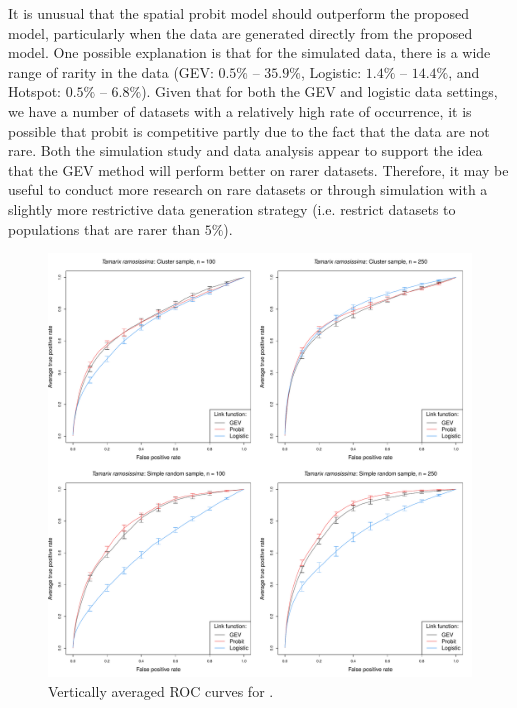 \documentclass[12pt]{article}
\begin{document}
It is unusual that the spatial probit model should outperform the proposed model, particularly when the data are generated directly from the proposed model.
One possible explanation is that for the simulated data, there is a wide range of rarity in the data (GEV: $0.5\%$ -- $35.9\%$, Logistic: $1.4\%$ -- $14.4\%$, and Hotspot: $0.5\%$ -- $6.8\%$).
Given that for both the GEV and logistic data settings, we have a number of datasets with a relatively high rate of occurrence, it is possible that probit is competitive partly due to the fact that the data are not rare.
Both the simulation study and data analysis appear to support the idea that the GEV method will perform better on rarer datasets.
Therefore, it may be useful to conduct more research on rare datasets or through simulation with a slightly more restrictive data generation strategy (i.e. restrict datasets to populations that are rarer than $5\%$).

\begin{figure}
	\includegraphics[width=\linewidth]{plots/data-perf-species1}
	\caption{Vertically averaged ROC curves for \tamarix{}.}
	\label{rbfig:data1roc}
\end{figure}
\end{document}
